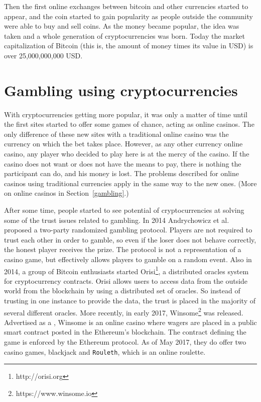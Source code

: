 Then the first online exchanges between bitcoin and other currencies started
  to appear, and the coin started to gain popularity as people outside the
  community were able to buy and sell coins.
As the money became popular, the idea was taken and a whole generation of
  cryptocurrencies was born.
Today the market capitalization of Bitcoin (this is, the amount of money times
  its value in USD) is over 25,000,000,000 USD.

\section{Gambling using cryptocurrencies}

With cryptocurrencies getting more popular, it was only a matter of time until
  the first sites started to offer some games of chance, acting as online
  casinos.
The only difference of these new sites with a traditional online casino was the
  currency on which the bet takes place.
However, as any other currency online casino, any player who decided to play
  here is at the mercy of the casino.
If the casino does not want or does not have the means to pay, there is nothing
  the participant can do, and his money is lost.
The problems described for online casinos using traditional currencies apply in
the same way to the new ones.
(More on online casinos in Section~\ref{gambling}.)

After some time, people started to see potential of cryptocurrencies at solving
  some of the trust issues related to gambling.
In 2014 Andrychowicz et al.~\cite{andrychowicz2014secure} proposed a
  two-party randomized gambling protocol.
Players are not required to trust each other in order to gamble, so even if the
  loser does not behave correctly, the honest player receives the prize.
The protocol is not a representation of a casino game, but effectively allows
  players to gamble on a random event.
Also in 2014, a group of Bitcoin enthusiasts started
  Orisi\footnote{http://orisi.org}, a distributed oracles system for
  cryptocurrency contracts.
Orisi allows users to access data from the outside world from the blockchain
  by using a distributed set of oracles. So instead of trusting in one instance
  to provide the data, the trust is placed in the majority of several different
  oracles.
More recently, in early 2017, Winsome\footnote{https://www.winsome.io} was
  released. Advertised as a , Winsome
  is an online casino where wagers are placed in a public smart contract posted
  in the Ethereum's blockchain.
The contract defining the game is enforced by the Ethereum protocol.
As of May 2017, they do offer two casino games, blackjack and \texttt{Rouleth},
  which is an online roulette.

